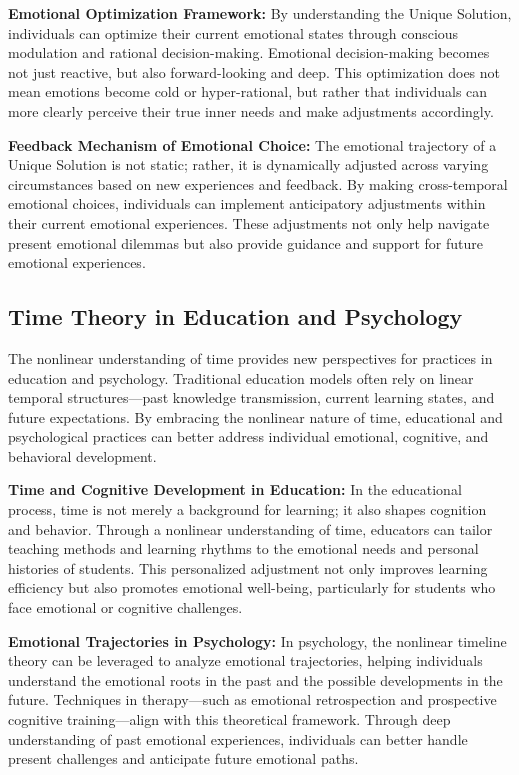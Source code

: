 \documentclass[12pt]{article}
\begin{document}
\textbf{Emotional Optimization Framework:} By understanding the Unique Solution, individuals can optimize their current emotional states through conscious modulation and rational decision-making. Emotional decision-making becomes not just reactive, but also forward-looking and deep. This optimization does not mean emotions become cold or hyper-rational, but rather that individuals can more clearly perceive their true inner needs and make adjustments accordingly.

\textbf{Feedback Mechanism of Emotional Choice:} The emotional trajectory of a Unique Solution is not static; rather, it is dynamically adjusted across varying circumstances based on new experiences and feedback. By making cross-temporal emotional choices, individuals can implement anticipatory adjustments within their current emotional experiences. These adjustments not only help navigate present emotional dilemmas but also provide guidance and support for future emotional experiences.

\subsection{Time Theory in Education and Psychology}

The nonlinear understanding of time provides new perspectives for practices in education and psychology. Traditional education models often rely on linear temporal structures—past knowledge transmission, current learning states, and future expectations. By embracing the nonlinear nature of time, educational and psychological practices can better address individual emotional, cognitive, and behavioral development.

\textbf{Time and Cognitive Development in Education:} In the educational process, time is not merely a background for learning; it also shapes cognition and behavior. Through a nonlinear understanding of time, educators can tailor teaching methods and learning rhythms to the emotional needs and personal histories of students. This personalized adjustment not only improves learning efficiency but also promotes emotional well-being, particularly for students who face emotional or cognitive challenges.

\textbf{Emotional Trajectories in Psychology:} In psychology, the nonlinear timeline theory can be leveraged to analyze emotional trajectories, helping individuals understand the emotional roots in the past and the possible developments in the future. Techniques in therapy—such as emotional retrospection and prospective cognitive training—align with this theoretical framework. Through deep understanding of past emotional experiences, individuals can better handle present challenges and anticipate future emotional paths.
\end{document}

